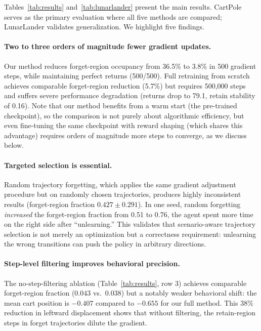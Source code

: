 \documentclass[sigconf]{acmart}
\begin{document}
Tables~\ref{tab:results} and~\ref{tab:lunarlander} present the main results. CartPole serves as the primary evaluation where all five methods are compared; LunarLander validates generalization. We highlight five findings.

\paragraph{Two to three orders of magnitude fewer gradient updates.} Our method reduces forget-region occupancy from 36.5\% to 3.8\% in 500 gradient steps, while maintaining perfect returns (500/500). Full retraining from scratch achieves comparable forget-region reduction (5.7\%) but requires 500{,}000 steps and suffers severe performance degradation (returns drop to 79.1, retain stability of 0.16). Note that our method benefits from a warm start (the pre-trained checkpoint), so the comparison is not purely about algorithmic efficiency, but even fine-tuning the same checkpoint with reward shaping (which shares this advantage) requires orders of magnitude more steps to converge, as we discuss below.

\paragraph{Targeted selection is essential.} Random trajectory forgetting, which applies the same gradient adjustment procedure but on randomly chosen trajectories, produces highly inconsistent results (forget-region fraction $0.427 \pm 0.291$). In one seed, random forgetting \emph{increased} the forget-region fraction from 0.51 to 0.76, the agent spent more time on the right side after ``unlearning.'' This validates that scenario-aware trajectory selection is not merely an optimization but a correctness requirement: unlearning the wrong transitions can push the policy in arbitrary directions.

\paragraph{Step-level filtering improves behavioral precision.} The no-step-filtering ablation (Table~\ref{tab:results}, row 3) achieves comparable forget-region fraction ($0.043$ vs.\ $0.038$) but a notably weaker behavioral shift: the mean cart position is $-0.407$ compared to $-0.655$ for our full method. This 38\% reduction in leftward displacement shows that without filtering, the retain-region steps in forget trajectories dilute the gradient.
\end{document}
